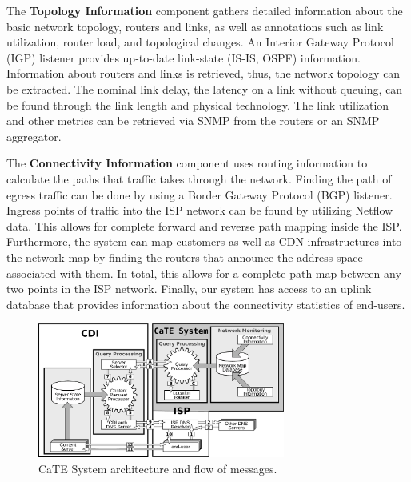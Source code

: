 The {\bf Topology Information} component gathers detailed information about the
basic network topology, \ie routers and links, as well as annotations such as
link utilization, router load, and topological changes.  An Interior Gateway
Protocol (IGP) listener provides up-to-date link-state (\ie IS-IS, OSPF)
information.  Information about routers and links is retrieved, thus, the
network topology can be extracted.  The nominal link delay, \ie the latency on
a link without queuing, can be found through the link length and physical
technology.  The link utilization and other metrics can be retrieved via SNMP
from the routers or an SNMP aggregator.

The {\bf Connectivity Information} component uses routing information to
calculate the paths that traffic takes through the network. Finding the path of
egress traffic can be done by using a Border Gateway Protocol (BGP) listener.
Ingress points of traffic into the ISP network can be found by utilizing
Netflow data. This allows for complete forward and reverse path mapping inside
the ISP.  Furthermore, the system can map customers as well as CDN
infrastructures into the network map by finding the routers that announce the
address space associated with them. In total, this allows for a complete path
map between any two points in the ISP network.  Finally, our system has access
to an uplink database that provides information about the connectivity
statistics of end-users.


\begin{figure}[tbp]
    \center \includegraphics[width=3.2in]{figures-pdf/CaTE_Schematic}
  \vspace{-0.1in}
    \caption{CaTE System architecture and flow of messages.}
    \label{fig:CaTE-architecture}
    \vspace{-0.2in}
\end{figure}

